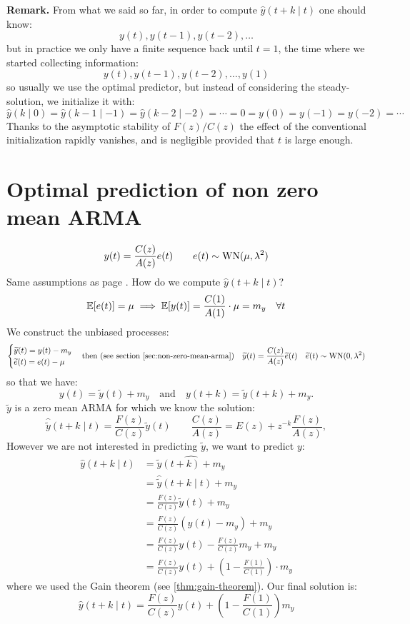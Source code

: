 \textbf{Remark.}
From what we said so far, in order to compute $\hat y(t+k\mid t)$ one should know:
\[
	y(t),y(t-1),y(t-2),\ldots
\]
but in practice we only have a finite sequence back until $t=1$, the time where we started collecting information:
\[
	y(t),y(t-1),y(t-2),\ldots,y(1)
\]
so usually we use the optimal predictor, but instead of considering the steady-solution, we initialize it with:
\[
	\hat y(k\mid 0) = \hat y(k-1\mid -1) = \hat y(k-2\mid -2) = \cdots = 0 = y(0) = y(-1) = y(-2) = \cdots
\]
Thanks to the asymptotic stability of $F(z)/C(z)$ the effect of the conventional initialization rapidly vanishes, and is negligible provided that $t$ is large enough.

\section{Optimal prediction of non zero mean ARMA}
\[
	y(t)=\frac{C(z)}{A(z)}e(t)\qquad e(t)\sim \operatorname{WN}(\mu,\lambda^2 )
\]
Same assumptions as page \pageref{assumptions-prediction-theory}. How do we compute $\hat y(t+k\mid t)$?
\[
	\mathbb{E}[e(t)] = \mu \implies \mathbb{E}[y(t)]=\frac{C(1)}{A(1)}\cdot\mu=m_{y} \quad \forall t
\]
We construct the unbiased processes:
\[
	\begin{cases}
		\widetilde y(t)=y(t)-m_{y}\\
		\widetilde e(t)=e(t)-\mu
	\end{cases}
	\text{then (see section \ref{sec:non-zero-mean-arma})}
	\quad
	\widetilde y(t)=\frac{C(z)}{A(z)}\widetilde e(t) \quad \widetilde e(t)\sim \operatorname{WN}(0,\lambda^2)
\]
so that we have:
\[
	y(t)=\tilde y(t)+m_{y} \quad\text{and}\quad y(t+k)=\tilde y(t+k)+m_{y}.
\]
$\tilde y$ is a zero mean ARMA for which we know the solution:
\[
	\hat{\tilde y} (t+k\mid t) = \frac{F(z)}{C(z)}\tilde y(t) \qquad \frac{C(z)}{A(z)}=E(z)+z^{-k}\frac{F(z) }{A(z)},
\]
However we are not interested in predicting $\tilde y$, we want to predict $y$:
\begin{align*}
	\hat y(t+k\mid t)&=\widehat{\tilde y(t+k)+m_{y}}\\
	&= \hat{\tilde y}(t+k\mid t)+m_{y}\\
	&=\frac{F(z)}{C(z)}\tilde y(t)+m_{y}\\
	&=\frac{F(z)}{C(z)}(y(t)-m_{y})+m_{y}\\
	&=\frac{F(z)}{C(z)}y(t)-\frac{F(z)}{C(z)}m_{y}+m_{y}\\
	&=\frac{F(z)}{C(z)}y(t)+\left( 1-\frac{F(1)}{C(1)} \right)  \cdot m_{y}
\end{align*}
where we used the Gain theorem (see \ref{thm:gain-theorem}). Our final solution is:
\[
	\boxed{\hat y(t+k\mid t) = \frac{F(z)}{C(z)}y(t)+\left( 1-\frac{F(1)}{C(1)} \right) m_{y}}
\]